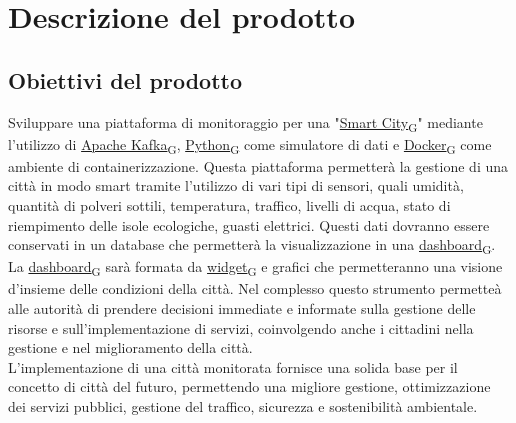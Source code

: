 \section{Descrizione del prodotto}
\subsection{Obiettivi del prodotto}
Sviluppare una piattaforma di monitoraggio per una "\href{https://7last.github.io/docs/rtb/documentazione-interna/glossario\#smart-city}{Smart City\textsubscript{G}}" mediante l'utilizzo di \href{https://7last.github.io/docs/rtb/documentazione-interna/glossario\#apache-kafka}{Apache Kafka\textsubscript{G}}, \href{https://7last.github.io/docs/rtb/documentazione-interna/glossario\#python}{Python\textsubscript{G}} come simulatore di dati e \href{https://7last.github.io/docs/rtb/documentazione-interna/glossario\#docker}{Docker\textsubscript{G}} come ambiente di containerizzazione. Questa piattaforma permetterà la gestione di una città in modo smart tramite l'utilizzo di vari tipi di sensori, quali umidità, quantità di polveri sottili, temperatura, traffico, livelli di acqua, stato di riempimento delle isole ecologiche, guasti elettrici. Questi dati dovranno essere conservati in un database che permetterà la visualizzazione in una \href{https://7last.github.io/docs/rtb/documentazione-interna/glossario\#dashboard}{dashboard\textsubscript{G}}. La \href{https://7last.github.io/docs/rtb/documentazione-interna/glossario\#dashboard}{dashboard\textsubscript{G}} sarà formata da \href{https://7last.github.io/docs/rtb/documentazione-interna/glossario\#widget}{widget\textsubscript{G}} e grafici che permetteranno una visione d'insieme delle condizioni della città. Nel complesso questo strumento permetteà alle autorità di prendere decisioni immediate e informate sulla gestione delle risorse e sull'implementazione di servizi, coinvolgendo anche i cittadini nella gestione e nel miglioramento della città.\\
L'implementazione di una città monitorata fornisce una solida base per il concetto di città del futuro, permettendo una migliore gestione, ottimizzazione dei servizi pubblici, gestione del traffico, sicurezza e sostenibilità ambientale.
